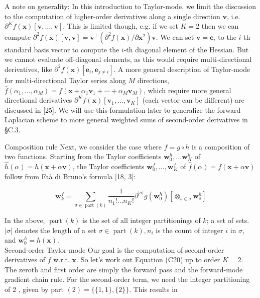 \documentclass[10pt]{article}
\begin{document}
A note on generality: In this introduction to Taylor-mode, we limit the discussion to the computation of higher-order derivatives along a single direction $\boldsymbol{v}$, i.e. $\partial^{K} f(\boldsymbol{x})[\boldsymbol{v}, \ldots, \boldsymbol{v}]$. This is limited though, e.g. if we set $K=2$ then we can compute $\partial^{2} f(\boldsymbol{x})[\boldsymbol{v}, \boldsymbol{v}]=\boldsymbol{v}^{\top}\left(\partial^{2} f(\boldsymbol{x}) / \partial \boldsymbol{x}^{2}\right) \boldsymbol{v}$. We can set $\boldsymbol{v}=\boldsymbol{e}_{i}$ to the $i$-th standard basis vector to compute the $i$-th diagonal element of the Hessian. But we cannot evaluate off-diagonal elements, as this would require multi-directional derivatives, like $\partial^{2} f(\boldsymbol{x})\left[\boldsymbol{e}_{i}, \boldsymbol{e}_{j \neq i}\right]$. A more general description of Taylor-mode for multi-directional Taylor series along $M$ directions, $\hat{f}\left(\alpha_{1}, \ldots, \alpha_{M}\right)=f\left(\boldsymbol{x}+\alpha_{1} \boldsymbol{v}_{1}+\cdots+\alpha_{M} \boldsymbol{v}_{M}\right)$, which require more general directional derivatives $\partial^{K} f(\boldsymbol{x})\left[\boldsymbol{v}_{1}, \ldots, \boldsymbol{v}_{K}\right]$ (each vector can be different) are discussed in [25]. We will use this formulation later to generalize the forward Laplacian scheme to more general weighted sums of second-order derivatives in §C.3.

Composition rule Next, we consider the case where $f=g \circ h$ is a composition of two functions. Starting from the Taylor coefficients $\boldsymbol{w}_{0}^{h}, \ldots \boldsymbol{w}_{K}^{h}$ of $\hat{h}(\alpha)=h(\boldsymbol{x}+\alpha \boldsymbol{v})$, the Taylor coefficients $\boldsymbol{w}_{0}^{f}, \ldots, \boldsymbol{w}_{K}^{f}$ of $\hat{f}(\alpha)=f(\boldsymbol{x}+\alpha \boldsymbol{v})$ follow from Faà di Bruno's formula [18, 3]:


\begin{equation*}
\boldsymbol{w}_{k}^{f}=\sum_{\sigma \in \operatorname{part}(k)} \frac{1}{n_{1}!\ldots n_{K}!} \partial^{|\sigma|} g\left(\boldsymbol{w}_{0}^{h}\right)\left[\otimes_{s \in \sigma} \boldsymbol{w}_{s}^{h}\right] \tag{C20}
\end{equation*}


In the above, $\operatorname{part}(k)$ is the set of all integer partitionings of $k$; a set of sets. $|\sigma|$ denotes the length of a set $\sigma \in \operatorname{part}(k), n_{i}$ is the count of integer $i$ in $\sigma$, and $\boldsymbol{w}_{0}^{h}=h(\boldsymbol{x})$.\\
Second-order Taylor-mode Our goal is the computation of second-order derivatives of $f$ w.r.t. $\boldsymbol{x}$. So let's work out Equation (C20) up to order $K=2$. The zeroth and first order are simply the forward pass and the forward-mode gradient chain rule. For the second-order term, we need the integer partitioning of 2 , given by part $(2)=\{\{1,1\},\{2\}\}$. This results in
\end{document}
